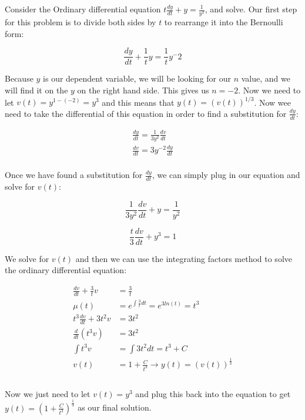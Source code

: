     \begin{problem}
      Consider the Ordinary differential equation $t\frac{dy}{dt}+y=\frac{1}{y^2}$, and solve. Our first step for this problem is to divide both sides by $t$ to rearrange it into the Bernoulli form:

      \begin{equation}
        \frac{dy}{dt}+\frac{1}{t}y=\frac{1}{t}y^-2
      \end{equation}

      Because $y$ is our dependent variable, we will be looking for our $n$ value, and we will find it on the $y$ on the right hand side. This gives us $n=-2$. Now we need to let $v(t)=y^{1-(-2)}=y^3$ and this means that $y(t)=(v(t))^{1/3}$. Now wee need to take the differential of this equation in order to find a substitution for $\frac{dy}{dt}$:

      \begin{align}
        \frac{dy}{dt}=\frac{1}{3y^2}\frac{dv}{dt}\\
        \frac{dv}{dt}=3y^{-2}\frac{dy}{dt}\\
      \end{align}

      Once we have found a substitution for $\frac{dy}{dt}$, we can simply plug in our equation and solve for $v(t)$:

      \begin{equation}
        \frac{1}{3y^2}\frac{dv}{dt}+y=\frac{1}{y^2}
      \end{equation}

      \begin{equation}
        \frac{t}{3}\frac{dv}{dt}+y^3=1
      \end{equation}

      We solve for $v(t)$ and then we can use the integrating factors method to solve the ordinary differential equation:

      \begin{equation}
        \begin{aligned}
          \frac{dv}{dt}+\frac{3}{t}v&=\frac{3}{t}\\
          \mu(t)&=e^{\int\frac{3}{t}dt}=e^{3ln(t)}=t^3\\
          t^3\frac{dv}{dt}+3t^2v&=3t^2\\
          \frac{d}{dt}(t^3v)&=3t^2\\
          \int t^3v&=\int3t^2dt=t^3+C\\
          v(t)&=1+\frac{C}{t^3}\to y(t)=(v(t))^{\frac{1}{3}}\\
        \end{aligned} 
      \end{equation}\\

      Now we just need to let $v(t)=y^3$ and plug this back into the equation to get $y(t)=\left(1+\frac{C}{t^3}\right)^{\frac{1}{3}}$ as our final solution.
    \end{problem}

